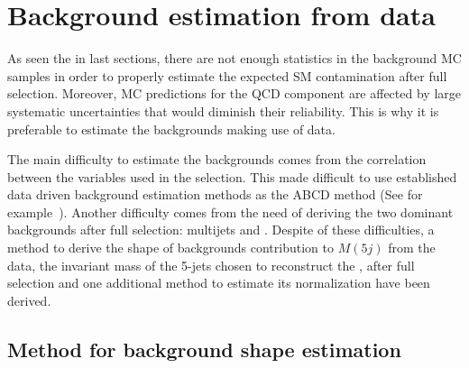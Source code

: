 \section{Background estimation from data}
\label{sec:bkg}

As seen the in last sections, there are not enough statistics in the background MC samples in order to properly estimate the expected SM contamination after full selection. Moreover, MC predictions for the QCD component are affected by large systematic uncertainties that would diminish their reliability. This is why it is preferable to estimate the backgrounds making use of data.

The main difficulty to estimate the backgrounds comes from the correlation between the variables used in the selection. This made difficult to use established data driven background estimation methods as the ABCD method (See for example~\cite{Khachatryan:2015axa}). Another difficulty comes from the need of deriving the two dominant backgrounds after full selection: multijets and \ttbar. Despite of these difficulties, a method to derive the shape of backgrounds contribution to $M(5j)$ from the data, the invariant mass of the 5-jets chosen to reconstruct the \Tp, after full selection and one additional method to estimate its normalization have been derived.

%
%
%

\subsection{Method for background shape estimation}
\label{sec:bkgmet}

